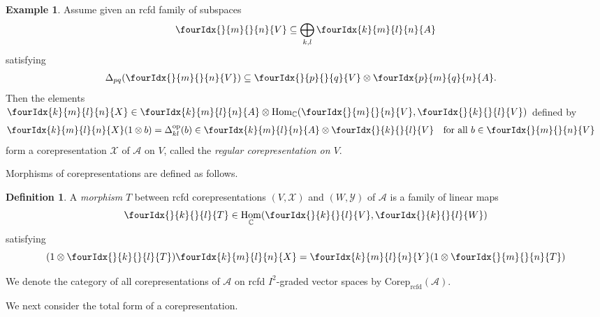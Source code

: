 \documentclass[10pt]{article}
\DeclareMathOperator{\Hom}{Hom}
\DeclareMathOperator{\op}{\mathrm{op}}
\DeclareMathOperator{\rcf}{\mathrm{rcfd}}
\newcommand{\Corep}{\mathrm{Corep}}
\newcommand{\C}{\mathbb{C}}
\newcommand{\Gr}[5]{\fourIdx{#2}{#4}{#3}{#5}{#1}}%
\newcommand{\Gru}[3]{\Gr{#1}{}{}{#2}{#3}}
\theoremstyle{definition}
\newtheorem{Def}[Theorem]{Definition}
\newtheorem{Exa}[Theorem]{Example}
\numberwithin{equation}{section}
\begin{document}
\begin{Exa} \label{example:rep-regular}
  Assume  given an rcfd family of subspaces
  \begin{align*}
    \Gru{V}{m}{n} \subseteq \bigoplus_{k,l} \Gr{A}{k}{l}{m}{n}
  \end{align*}
  satisfying
  \begin{align} \label{eq:rep-regular-inclusion}
    \Delta_{pq}(\Gru{V}{m}{n}) &\subseteq \Gru{V}{p}{q} \otimes
    \Gr{A}{p}{q}{m}{n}.
  \end{align}
Then the  elements $\Gr{X}{k}{l}{m}{n} \in \Gr{A}{k}{l}{m}{n} \otimes
  \Hom_{\C}(\Gru{V}{m}{n},\Gru{V}{k}{l})$ defined by 
  \begin{align*}
    \Gr{X}{k}{l}{m}{n}(1 \otimes b) &= \Delta^{\op}_{kl}(b) \in
    \Gr{A}{k}{l}{m}{n} \otimes \Gru{V}{k}{l} \quad
    \text{for all } b\in \Gru{V}{m}{n}
  \end{align*}
  form a corepresentation $\mathscr{X}$ of $\mathscr{A}$ on
  $V$, called the 
  \emph{regular corepresentation on $V$}. 
\end{Exa}

Morphisms of corepresentations are defined as follows.
\begin{Def} A \emph{morphism}
  $T$ between rcfd corepresentations
  $(V,\mathscr{X})$ and $(W,\mathscr{Y})$ of $\mathscr{A}$ is a family
  of linear maps
  \[\Gru{T}{k}{l} \in
  \Hom_\C(\Gru{V}{k}{l},\Gru{W}{k}{l})\] satisfying \[(1 \otimes
  \Gru{T}{k}{l})\Gr{X}{k}{l}{m}{n} = \Gr{Y}{k}{l}{m}{n}(1 \otimes
  \Gru{T}{m}{n})\]
\end{Def}
We denote the category of all corepresentations of $\mathscr{A}$ on rcfd $I^2$-graded vector spaces by
$\Corep_{\rcf}(\mathscr{A})$.

We next consider the total form of a corepresentation.
\end{document}
